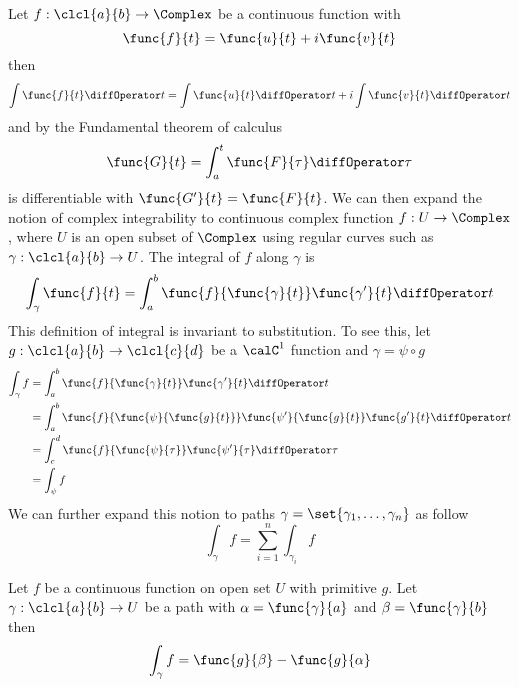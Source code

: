 Let \(f:\clcl{a}{b} \to \Complex\) be a continuous function with 
\begin{equation*}
    \func{f}{t} = \func{u}{t} + i \func{v}{t}
\end{equation*}
then 
\begin{equation*}
    \int \func{f}{t} \diffOperator t = \int \func{u}{t} \diffOperator t + i \int \func{v}{t} \diffOperator t
\end{equation*}
and by the Fundamental theorem of calculus 
\begin{equation*}
    \func{G}{t} = \int_a^t \func{F}{\tau} \diffOperator \tau
\end{equation*}
is differentiable with \(\func{G'}{t} = \func{F}{t}\).
We can then expand the notion of complex integrability to continuous complex function \(f: U \to \Complex\), where \(U\) is an open subset of \(\Complex\) using regular curves such as \(\gamma:\clcl{a}{b} \to U\). The integral of \(f\) along \(\gamma\) is 
\begin{equation*}
    \int_{\gamma} \func{f}{t} = \int_a^b \func{f}{\func{\gamma}{t}} \func{\gamma'}{t} \diffOperator t
\end{equation*}
This definition of integral is invariant to substitution. To see this, let \(g:\clcl{a}{b} \to \clcl{c}{d}\) be a \(\calC^1\) function and \(\gamma = \psi \circ g\)
\begin{align*}
    \int_{\gamma} f &= \int_a^b \func{f}{\func{\gamma}{t}} \func{\gamma'}{t} \diffOperator t\\
    &= \int_a^b \func{f}{\func{\psi}{\func{g}{t}}} \func{\psi'}{\func{g}{t}} \func{g' }{t} \diffOperator t\\
    &= \int_c^d \func{f}{\func{\psi}{\tau}} \func{\psi'}{\tau} \diffOperator \tau \\
    &= \int_{\psi} f
\end{align*}
We can further expand this notion to paths \(\gamma = \set{\gamma_1, \dots , \gamma_n}\) as follow 
\begin{equation*}
    \int_{\gamma} f = \sum_{i = 1}^n \int_{\gamma_i} f
\end{equation*}

\begin{theorem}
    Let \(f\) be a continuous function on open set \(U\) with primitive \(g\). Let \(\gamma:\clcl{a}{b} \to U\) be a path with \(\alpha= \func{\gamma}{a}\) and \(\beta = \func{\gamma}{b}\) then 
    \begin{equation*}
        \int_{\gamma} f = \func{g}{\beta} - \func{g}{\alpha}
    \end{equation*}
\end{theorem}

